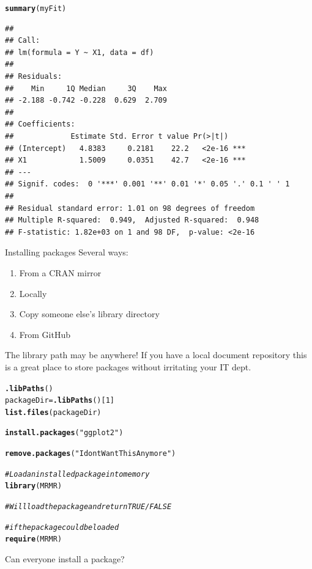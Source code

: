 \documentclass[xcolor=dvipsnames]{beamer}
\makeatletter
\newcommand{\hlnum}[1]{\textcolor[rgb]{0.686,0.059,0.569}{#1}}%
\newcommand{\hlstr}[1]{\textcolor[rgb]{0.192,0.494,0.8}{#1}}%
\newcommand{\hlcom}[1]{\textcolor[rgb]{0.678,0.584,0.686}{\textit{#1}}}%
\newcommand{\hlstd}[1]{\textcolor[rgb]{0.345,0.345,0.345}{#1}}%
\newcommand{\hlkwb}[1]{\textcolor[rgb]{0.69,0.353,0.396}{#1}}%
\newcommand{\hlkwd}[1]{\textcolor[rgb]{0.737,0.353,0.396}{\textbf{#1}}}%
\newenvironment{kframe}{%
 \def\at@end@of@kframe{}%
 \ifinner\ifhmode%
  \def\at@end@of@kframe{\end{minipage}}%
  \begin{minipage}{\columnwidth}%
 \fi\fi%
 \def\FrameCommand##1{\hskip\@totalleftmargin \hskip-\fboxsep
 \colorbox{shadecolor}{##1}\hskip-\fboxsep
     \hskip-\linewidth \hskip-\@totalleftmargin \hskip\columnwidth}%
 \MakeFramed {\advance\hsize-\width
   \@totalleftmargin\z@ \linewidth\hsize
   \@setminipage}}%
 {\par\unskip\endMakeFramed%
 \at@end@of@kframe}
\newenvironment{knitrout}{}{} %
\makeatother
\begin{document}
\begin{frame}[fragile]
\begin{knitrout}\tiny
{}\color{fgcolor}\begin{kframe}
\begin{alltt}
\hlkwd{summary}\hlstd{(myFit)}
\end{alltt}
\begin{verbatim}
## 
## Call:
## lm(formula = Y ~ X1, data = df)
## 
## Residuals:
##    Min     1Q Median     3Q    Max 
## -2.188 -0.742 -0.228  0.629  2.709 
## 
## Coefficients:
##             Estimate Std. Error t value Pr(>|t|)    
## (Intercept)   4.8383     0.2181    22.2   <2e-16 ***
## X1            1.5009     0.0351    42.7   <2e-16 ***
## ---
## Signif. codes:  0 '***' 0.001 '**' 0.01 '*' 0.05 '.' 0.1 ' ' 1
## 
## Residual standard error: 1.01 on 98 degrees of freedom
## Multiple R-squared:  0.949,	Adjusted R-squared:  0.948 
## F-statistic: 1.82e+03 on 1 and 98 DF,  p-value: <2e-16
\end{verbatim}
\end{kframe}
\end{knitrout}

\end{frame}

\begin{frame}{Installing packages}
Several ways: 
\begin{enumerate}
  \item From a CRAN mirror
  \item Locally
  \item Copy someone else's library directory
  \item From GitHub
\end{enumerate}
The library path may be anywhere! If you have a local document repository
this is a great place to store packages without irritating your IT dept.
\end{frame}

\begin{frame}[fragile]
\begin{knitrout}
\color{fgcolor}\begin{kframe}
\begin{alltt}
\hlkwd{.libPaths}\hlstd{()}
\hlstd{packageDir} \hlkwb{=} \hlkwd{.libPaths}\hlstd{()[}\hlnum{1}\hlstd{]}
\hlkwd{list.files}\hlstd{(packageDir)}

\hlkwd{install.packages}\hlstd{(}\hlstr{"ggplot2"}\hlstd{)}

\hlkwd{remove.packages}\hlstd{(}\hlstr{"IdontWantThisAnymore"}\hlstd{)}

\hlcom{# Load an installed package into memory}
\hlkwd{library}\hlstd{(MRMR)}

\hlcom{# Will load the package and return TRUE/FALSE}

\hlcom{# if the package could be loaded}
\hlkwd{require}\hlstd{(MRMR)}
\end{alltt}
\end{kframe}
\end{knitrout}

\end{frame}

\begin{frame}
Can everyone install a package?
\end{frame}
\end{document}

